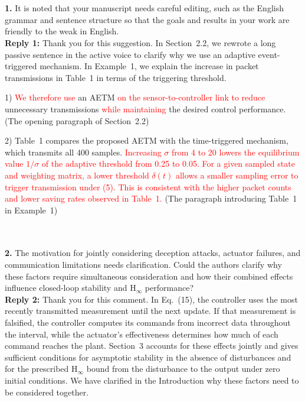 \documentclass[10pt,fleqn]{article}
\begin{document}
\\
~\\
\textbf{1.} It is noted that your manuscript needs careful editing, such as the English grammar and sentence structure so that the goals and results in your work are friendly to the weak in English.
\\[10pt]
\begingroup
\setlength{\parskip}{6pt}
\indent \textbf{Reply 1:} Thank you for this suggestion. In Section~2.2, we rewrote a long passive sentence in the active voice to clarify why we use an adaptive event-triggered mechanism. In Example~1, we explain the increase in packet transmissions in Table~1 in terms of the triggering threshold.\par
1) \textcolor{red}{We therefore use} an AETM \textcolor{red}{on the sensor-to-controller link to reduce} unnecessary transmissions \textcolor{red}{while maintaining} the desired control performance. (The opening paragraph of Section~2.2)\par
2) Table~1 compares the proposed AETM with the time-triggered mechanism, which transmits all 400 samples. \textcolor{red}{Increasing $\sigma$ from 4 to 20 lowers the equilibrium value $1/\sigma$ of the adaptive threshold from 0.25 to 0.05. For a given sampled state and weighting matrix, a lower threshold $\delta(t)$ allows a smaller sampling error to trigger transmission under (5). This is consistent with the higher packet counts and lower saving rates observed in Table~1.} (The paragraph introducing Table~1 in Example~1)\par
\endgroup

~\\
\\
\textbf{2.} The motivation for jointly considering deception attacks, actuator failures, and communication limitations needs clarification. Could the authors clarify why these factors require simultaneous consideration and how their combined effects influence closed-loop stability and $\mathrm{H}_{\infty}$ performance?
\\[10pt]
\indent \textbf{Reply 2:} Thank you for this comment. In Eq.~(15), the controller uses the most recently transmitted measurement until the next update. If that measurement is falsified, the controller computes its commands from incorrect data throughout the interval, while the actuator's effectiveness determines how much of each command reaches the plant. Section~3 accounts for these effects jointly and gives sufficient conditions for asymptotic stability in the absence of disturbances and for the prescribed $\mathrm{H}_\infty$ bound from the disturbance to the output under zero initial conditions. We have clarified in the Introduction why these factors need to be considered together.\\
\end{document}
